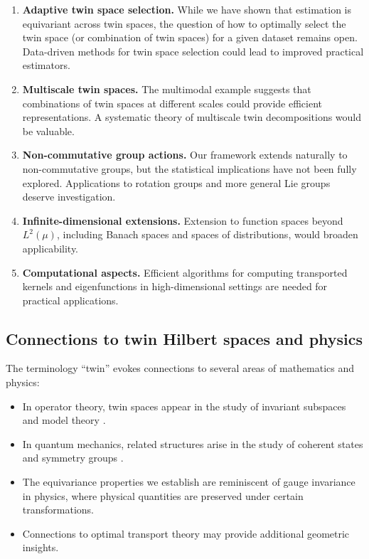 \documentclass[11pt,a4paper]{article}
\begin{document}
\begin{enumerate}
\item \textbf{Adaptive twin space selection.} While we have shown that estimation is equivariant across twin spaces, the question of how to optimally select the twin space (or combination of twin spaces) for a given dataset remains open. Data-driven methods for twin space selection could lead to improved practical estimators.

\item \textbf{Multiscale twin spaces.} The multimodal example suggests that combinations of twin spaces at different scales could provide efficient representations. A systematic theory of multiscale twin decompositions would be valuable.

\item \textbf{Non-commutative group actions.} Our framework extends naturally to non-commutative groups, but the statistical implications have not been fully explored. Applications to rotation groups and more general Lie groups deserve investigation.

\item \textbf{Infinite-dimensional extensions.} Extension to function spaces beyond $L^2(\mu)$, including Banach spaces and spaces of distributions, would broaden applicability.

\item \textbf{Computational aspects.} Efficient algorithms for computing transported kernels and eigenfunctions in high-dimensional settings are needed for practical applications.
\end{enumerate}

\subsection{Connections to twin Hilbert spaces and physics}

The terminology ``twin'' evokes connections to several areas of mathematics and physics:

\begin{itemize}
\item In operator theory, twin spaces appear in the study of invariant subspaces and model theory \citep{Halmos1982,Nikolski2002}.

\item In quantum mechanics, related structures arise in the study of coherent states and symmetry groups \citep{Perelomov1986}.

\item The equivariance properties we establish are reminiscent of gauge invariance in physics, where physical quantities are preserved under certain transformations.

\item Connections to optimal transport theory \citep{Villani2009} may provide additional geometric insights.
\end{itemize}
\end{document}
